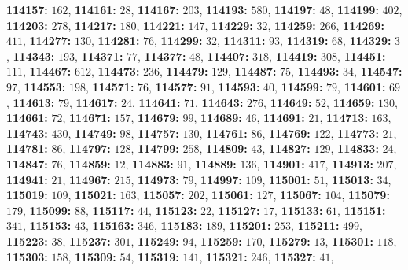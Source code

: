 \textsf{\bfseries 114157:} $162$, \textsf{\bfseries 114161:} $28$, \textsf{\bfseries 114167:} $203$, \textsf{\bfseries 114193:} $580$, \textsf{\bfseries 114197:} $48$, \textsf{\bfseries 114199:} $402$, \textsf{\bfseries 114203:} $278$, \textsf{\bfseries 114217:} $180$, \textsf{\bfseries 114221:} $147$, \textsf{\bfseries 114229:} $32$, \textsf{\bfseries 114259:} $266$, \textsf{\bfseries 114269:} $411$, \textsf{\bfseries 114277:} $130$, \textsf{\bfseries 114281:} $76$, \textsf{\bfseries 114299:} $32$, \textsf{\bfseries 114311:} $93$, \textsf{\bfseries 114319:} $68$, \textsf{\bfseries 114329:} $3$, \textsf{\bfseries 114343:} $193$, \textsf{\bfseries 114371:} $77$, \textsf{\bfseries 114377:} $48$, \textsf{\bfseries 114407:} $318$, \textsf{\bfseries 114419:} $308$, \textsf{\bfseries 114451:} $111$, \textsf{\bfseries 114467:} $612$, \textsf{\bfseries 114473:} $236$, \textsf{\bfseries 114479:} $129$, \textsf{\bfseries 114487:} $75$, \textsf{\bfseries 114493:} $34$, \textsf{\bfseries 114547:} $97$, \textsf{\bfseries 114553:} $198$, \textsf{\bfseries 114571:} $76$, \textsf{\bfseries 114577:} $91$, \textsf{\bfseries 114593:} $40$, \textsf{\bfseries 114599:} $79$, \textsf{\bfseries 114601:} $69$, \textsf{\bfseries 114613:} $79$, \textsf{\bfseries 114617:} $24$, \textsf{\bfseries 114641:} $71$, \textsf{\bfseries 114643:} $276$, \textsf{\bfseries 114649:} $52$, \textsf{\bfseries 114659:} $130$, \textsf{\bfseries 114661:} $72$, \textsf{\bfseries 114671:} $157$, \textsf{\bfseries 114679:} $99$, \textsf{\bfseries 114689:} $46$, \textsf{\bfseries 114691:} $21$, \textsf{\bfseries 114713:} $163$, \textsf{\bfseries 114743:} $430$, \textsf{\bfseries 114749:} $98$, \textsf{\bfseries 114757:} $130$, \textsf{\bfseries 114761:} $86$, \textsf{\bfseries 114769:} $122$, \textsf{\bfseries 114773:} $21$, \textsf{\bfseries 114781:} $86$, \textsf{\bfseries 114797:} $128$, \textsf{\bfseries 114799:} $258$, \textsf{\bfseries 114809:} $43$, \textsf{\bfseries 114827:} $129$, \textsf{\bfseries 114833:} $24$, \textsf{\bfseries 114847:} $76$, \textsf{\bfseries 114859:} $12$, \textsf{\bfseries 114883:} $91$, \textsf{\bfseries 114889:} $136$, \textsf{\bfseries 114901:} $417$, \textsf{\bfseries 114913:} $207$, \textsf{\bfseries 114941:} $21$, \textsf{\bfseries 114967:} $215$, \textsf{\bfseries 114973:} $79$, \textsf{\bfseries 114997:} $109$, \textsf{\bfseries 115001:} $51$, \textsf{\bfseries 115013:} $34$, \textsf{\bfseries 115019:} $109$, \textsf{\bfseries 115021:} $163$, \textsf{\bfseries 115057:} $202$, \textsf{\bfseries 115061:} $127$, \textsf{\bfseries 115067:} $104$, \textsf{\bfseries 115079:} $179$, \textsf{\bfseries 115099:} $88$, \textsf{\bfseries 115117:} $44$, \textsf{\bfseries 115123:} $22$, \textsf{\bfseries 115127:} $17$, \textsf{\bfseries 115133:} $61$, \textsf{\bfseries 115151:} $341$, \textsf{\bfseries 115153:} $43$, \textsf{\bfseries 115163:} $346$, \textsf{\bfseries 115183:} $189$, \textsf{\bfseries 115201:} $253$, \textsf{\bfseries 115211:} $499$, \textsf{\bfseries 115223:} $38$, \textsf{\bfseries 115237:} $301$, \textsf{\bfseries 115249:} $94$, \textsf{\bfseries 115259:} $170$, \textsf{\bfseries 115279:} $13$, \textsf{\bfseries 115301:} $118$, \textsf{\bfseries 115303:} $158$, \textsf{\bfseries 115309:} $54$, \textsf{\bfseries 115319:} $141$, \textsf{\bfseries 115321:} $246$, \textsf{\bfseries 115327:} $41$, 
